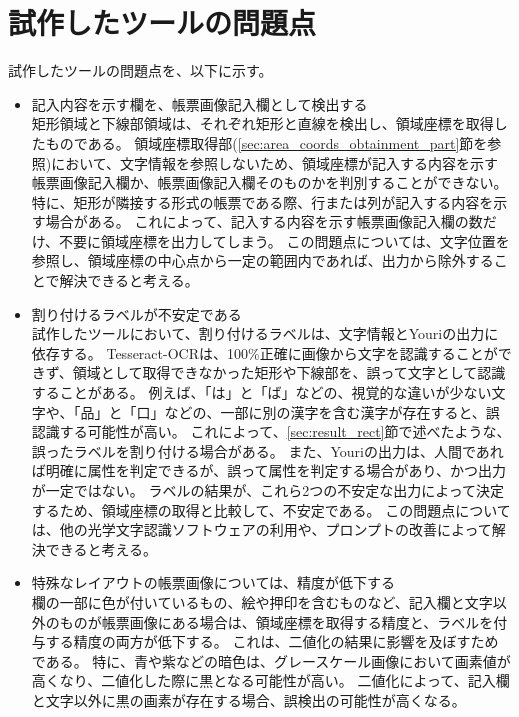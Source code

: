 \section{試作したツールの問題点}\label{sec:problems}
試作したツールの問題点を、以下に示す。

\begin{itemize}
    \item 記入内容を示す欄を、帳票画像記入欄として検出する\\
        矩形領域と下線部領域は、それぞれ矩形と直線を検出し、領域座標を取得したものである。
        領域座標取得部(\ref{sec:area_coords_obtainment_part}節を参照)において、文字情報を参照しないため、領域座標が記入する内容を示す帳票画像記入欄か、帳票画像記入欄そのものかを判別することができない。
        特に、矩形が隣接する形式の帳票である際、行または列が記入する内容を示す場合がある。
        これによって、記入する内容を示す帳票画像記入欄の数だけ、不要に領域座標を出力してしまう。
        この問題点については、文字位置を参照し、領域座標の中心点から一定の範囲内であれば、出力から除外することで解決できると考える。
    \item 割り付けるラベルが不安定である\\
        試作したツールにおいて、割り付けるラベルは、文字情報とYouriの出力に依存する。
        Tesseract-OCRは、100\%正確に画像から文字を認識することができず、領域として取得できなかった矩形や下線部を、誤って文字として認識することがある。
        例えば、「は」と「ば」などの、視覚的な違いが少ない文字や、「品」と「口」などの、一部に別の漢字を含む漢字が存在すると、誤認識する可能性が高い。
        これによって、\ref{sec:result_rect}節で述べたような、誤ったラベルを割り付ける場合がある。
        また、Youriの出力は、人間であれば明確に属性を判定できるが、誤って属性を判定する場合があり、かつ出力が一定ではない。
        ラベルの結果が、これら2つの不安定な出力によって決定するため、領域座標の取得と比較して、不安定である。 
        この問題点については、他の光学文字認識ソフトウェアの利用や、プロンプトの改善によって解決できると考える。
    \item 特殊なレイアウトの帳票画像については、精度が低下する\\
        欄の一部に色が付いているもの、絵や押印を含むものなど、記入欄と文字以外のものが帳票画像にある場合は、領域座標を取得する精度と、ラベルを付与する精度の両方が低下する。
        これは、二値化の結果に影響を及ぼすためである。
        特に、青や紫などの暗色は、グレースケール画像において画素値が高くなり、二値化した際に黒となる可能性が高い。
        二値化によって、記入欄と文字以外に黒の画素が存在する場合、誤検出の可能性が高くなる。

\end{itemize}
